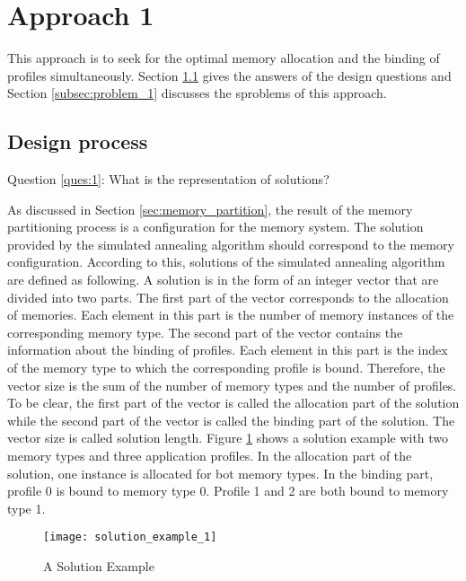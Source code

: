 	\section{Approach 1}
	\label{sec:stage_1}
	This approach is to seek for the optimal memory allocation and the
	binding of profiles simultaneously.
	Section \ref{subsec:design_1} gives the answers of the design
	questions and Section \ref{subsec:problem_1} discusses the
	sproblems of this approach.
		\subsection{Design process}
		\label{subsec:design_1}
		Question \ref{ques:1}: What is the representation of solutions?
		
		As discussed in Section \ref{sec:memory_partition}, the result of the memory
		partitioning process is a configuration for the memory system.
		The solution provided by the simulated annealing algorithm should correspond
		to the memory configuration.
		According to this, solutions of the simulated annealing algorithm are defined
		as following. A solution is in the form of an integer vector that are divided
		into two parts. The first part of the vector corresponds to the allocation
		of memories.
		Each element in this part is the number of memory instances of the corresponding
		memory type.
		The second part of the vector contains the information about the binding of profiles.
		Each element in this part is the index of the memory type to which the corresponding
		profile is bound.
		Therefore, the vector size is the sum of the number of memory types and the
		number of profiles.
		To be clear, the first part of the vector is called the allocation part of
		the solution while the second part of the vector is called the binding part
		of the solution. The vector size is called solution length.
		Figure \ref{fig:solu_exam_1} shows a solution example with two memory types and
		three application profiles.
		In the allocation part of the solution, one instance is allocated for bot
		 memory types.
		In the binding part, profile 0 is bound to memory type 0.
		Profile 1 and 2 are both bound to memory type 1.
		\begin{figure}[h]
			\begin{center}
				\texttt{[image: solution\_example\_1]}
				\caption{A Solution Example}
				\label{fig:solu_exam_1}
			\end{center}
		\end{figure}

